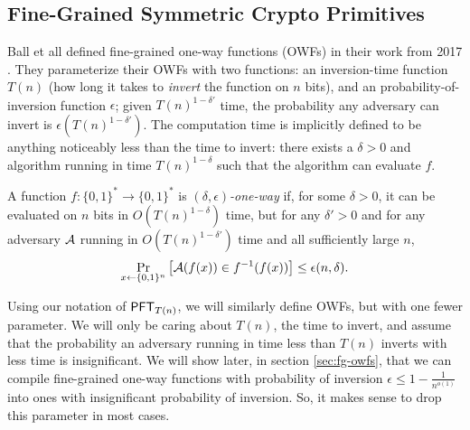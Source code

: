 \subsection{Fine-Grained Symmetric Crypto Primitives}

Ball et all defined fine-grained one-way functions (OWFs) in their work from 2017 \cite{avgCaseFineGrained}. They parameterize their OWFs with two functions: an inversion-time function $T(n)$ (how long it takes to \emph{invert} the function on $n$ bits), and an probability-of-inversion function $\epsilon$; given $T(n)^{1-\delta'}$ time, the probability any adversary can invert is $\epsilon(T(n)^{1-\delta'})$. The computation time is implicitly defined to be anything noticeably less than the time to invert: there exists a $\delta > 0$ and algorithm running in time $T(n)^{1-\delta}$ such that the algorithm can evaluate $f$.


\begin{definition}
	A function $f:\{0,1\}^* \to \{0,1\}^*$ is \emph{$(\delta, \epsilon)$-one-way} if, for some $\delta > 0$, it can be evaluated on $n$ bits in $O(T(n)^{1 - \delta})$ time, but for any $\delta' > 0$ and for any adversary $\mathcal{A}$ running in $O(T(n)^{1 - \delta'})$ time and all sufficiently large $n$,
	\[\Pr_{x \gets \{0,1\}^n}\left[\mathcal{A}(f(x)) \in f^{-1}(f(x))\right] \le \epsilon(n, \delta).\]
\end{definition}

Using our notation of $\mathsf{PFT}_{T(n)}$, we will similarly define OWFs, but with one fewer parameter. We will only be caring about $T(n)$, the time to invert, and assume that the probability an adversary running in time less than $T(n)$ inverts with less time is insignificant. We will show later, in section \ref{sec:fg-owfs}, that we can compile fine-grained one-way functions with probability of inversion $\epsilon \le 1-\frac{1}{n^{o(1)}}$ into ones with insignificant probability of inversion. So, it makes sense to drop this parameter in most cases.


